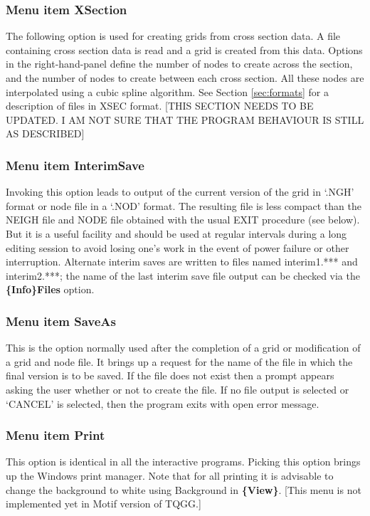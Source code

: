 \documentclass{article}
\begin{document}
\subsubsection[Menu item CrossSection]{Menu item XSection}
The following option is used for creating grids from cross section data. A file containing cross section data is read and a grid is created from this data. Options in the right-hand-panel define the number of nodes to create across the section, and the number of nodes to create between each cross section. All these nodes are interpolated using a cubic spline algorithm. See Section \ref{sec:formats} for a description of files in XSEC format.  [THIS SECTION NEEDS TO BE UPDATED.  I AM NOT SURE THAT THE PROGRAM BEHAVIOUR IS STILL AS DESCRIBED]

\subsubsection[Menu item InterimSave]{Menu item InterimSave}
Invoking this option leads to output of the current version of the grid in `.NGH' format or node file in a `.NOD' format. The resulting file is less compact than the NEIGH file and NODE file obtained with the usual EXIT procedure (see below). But it is a useful facility and should be used at regular intervals during a long editing session to avoid losing one's work in the event of power failure or other interruption. Alternate interim saves are written to files named interim1.*** and interim2.***; the name of the last interim save file output can be checked via the \textbf{\{Info\}Files} option.

\subsubsection[Menu item SaveAs]{Menu item SaveAs}
This is the option normally used after the completion of a grid or modification of a grid and node file. It brings up a request for the name of the file in which the final version is to be saved. If the file does not exist then a prompt appears asking the user whether or not to create the file. If no file output is selected or `CANCEL' is selected, then the program exits with open error message.

\subsubsection[Menu item Print]{Menu item Print}
This option is identical in all the interactive programs. Picking this option brings up the Windows print manager. Note that for all printing it is advisable to change the background to white using Background in \textbf{\{View\}}. [This menu is not implemented yet in Motif version of TQGG.]
\end{document}
